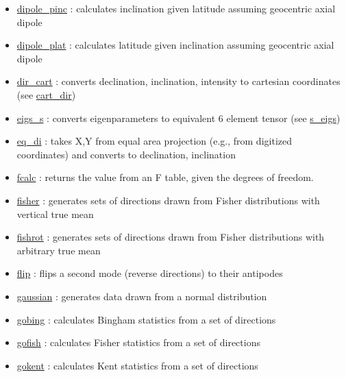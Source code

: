 \documentclass[11pt]{book}
\begin{document}
{{\begin{itemize}
\item \href{https://pmagpy.github.io/PmagPy_calculations.html#dipole_pinc}{dipole\_pinc} : calculates inclination given latitude assuming geocentric axial dipole
\item \href{https://pmagpy.github.io/PmagPy_calculations.html#dipole_plat}{dipole\_plat} : calculates latitude given inclination assuming geocentric axial dipole
\item \href{https://pmagpy.github.io/PmagPy_calculations.html#dir_cart}{dir\_cart} : converts declination, inclination, intensity to cartesian coordinates (see \href{https://pmagpy.github.io/PmagPy_calculations.html#cart_dir}{cart\_dir})
\item \href{https://pmagpy.github.io/PmagPy_calculations.html#eigs_s}{eigs\_s} : converts eigenparameters to equivalent 6 element tensor (see \href{https://pmagpy.github.io/PmagPy_calculations.html#s_eigs}{s\_eigs})
\item \href{https://pmagpy.github.io/PmagPy_calculations.html#eq_di}{eq\_di} : takes X,Y from equal area projection (e.g., from digitized coordinates) and  converts to declination, inclination
\item \href{https://pmagpy.github.io/PmagPy_calculations.html#fcalc}{fcalc} : returns the value from an F table, given the degrees of freedom.
\item \href{https://pmagpy.github.io/PmagPy_calculations.html#fisher}{fisher} : generates sets of directions drawn from Fisher distributions with vertical true mean
\item \href{https://pmagpy.github.io/PmagPy_calculations.html#fishrot}{fishrot} : generates sets of directions drawn from Fisher distributions with arbitrary true mean
\item \href{https://pmagpy.github.io/PmagPy_calculations.html#flip}{flip} : flips a second mode (reverse directions) to their antipodes
\item \href{https://pmagpy.github.io/PmagPy_calculations.html#gaussian}{gaussian} : generates data drawn from a normal distribution
\item \href{https://pmagpy.github.io/PmagPy_calculations.html#gobing}{gobing} : calculates Bingham statistics from a set of directions
\item \href{https://pmagpy.github.io/PmagPy_calculations.html#gofish}{gofish} : calculates Fisher statistics from a set of directions
\item \href{https://pmagpy.github.io/PmagPy_calculations.html#gokent}{gokent} : calculates Kent statistics from a set of directions

\end{itemize}}}
\end{document}
